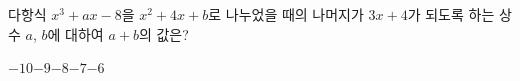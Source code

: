 다항식 $x^3+ax-8$을 $x^2+4x+b$로 나누었을 때의 나머지가 $3x+4$가 되도록 하는 상수 $a$, $b$에 대하여 $a+b$의 값은?
\begin{choices32}{$-10$}{$-9$}{$-8$}{$-7$}{$-6$}\end{choices32}
